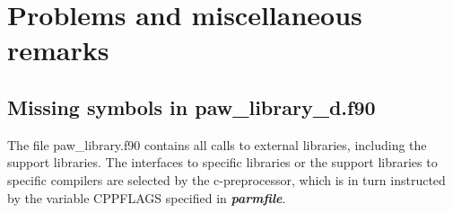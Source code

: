 \documentclass[a4paper,10pt]{report}
\newcommand{\myspec}[1]{\textbf{\textit{#1}}}
\begin{document}



\chapter{Problems and miscellaneous remarks}


\section{Missing symbols in paw\_library\_d.f90}
The file paw\_library.f90 contains all calls to external libraries,
including the support libraries. The interfaces to specific libraries
or the support libraries to specific compilers are selected by the
c-preprocessor, which is in turn instructed by the variable CPPFLAGS
specified in \myspec{parmfile}.
\end{document}
